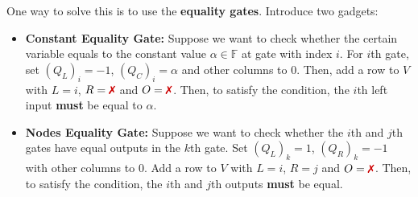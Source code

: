 \documentclass[../lecture-notes.tex]{subfiles}
\begin{document}
\begin{proposition}

One way to solve this is to use the \textbf{equality gates}. Introduce two gadgets:
\begin{itemize}
    \item \textbf{Constant Equality Gate:} Suppose we want to check whether the
    certain variable equals to the constant value $\alpha \in \mathbb{F}$ at
    gate with index $i$. For $i$th gate, set $(Q_L)_i = -1$, $(Q_C)_i = \alpha$
    and other columns to $0$. Then, add a row to $V$ with $L = i$, $R =
    \text{\xmark}$ and $O = \text{\xmark}$. Then, to satisfy the condition, the
    $i$th left input \textbf{must} be equal to $\alpha$.
    \item \textbf{Nodes Equality Gate:} Suppose we want to check whether the
    $i$th and $j$th gates have equal outputs in the $k$th gate. Set $(Q_L)_k = 1$, $(Q_R)_k = -1$ 
    with other columns to $0$. Add a row to $V$ with $L =
    i$, $R = j$ and $O = \text{\xmark}$. Then, to satisfy the condition, the
    $i$th and $j$th outputs \textbf{must} be equal.
\end{itemize}

\end{proposition}
\end{document}
